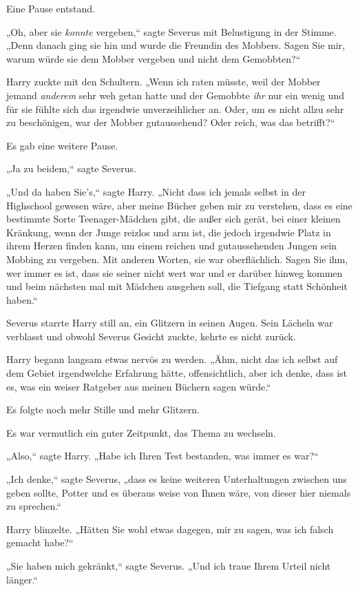 {Eine Pause entstand.

„Oh, aber sie \emph{konnte} vergeben,“ sagte Severus mit Belustigung in der Stimme. „Denn danach ging sie hin und wurde die Freundin des Mobbers. Sagen Sie mir, warum würde sie dem Mobber vergeben und nicht dem Gemobbten?“

Harry zuckte mit den Schultern. „Wenn ich raten müsste, weil der Mobber jemand \emph{anderem} sehr weh getan hatte und der Gemobbte \emph{ihr} nur ein wenig und für sie fühlte sich das irgendwie unverzeihlicher an. Oder, um es nicht allzu sehr zu beschönigen, war der Mobber gutaussehend? Oder reich, was das betrifft?“

Es gab eine weitere Pause.

„Ja zu beidem,“ sagte Severus.

„Und da haben Sie's,“ sagte Harry. „Nicht dass ich jemals selbst in der Highschool gewesen wäre, aber meine Bücher geben mir zu verstehen, dass es eine bestimmte Sorte Teenager-Mädchen gibt, die außer sich gerät, bei einer kleinen Kränkung, wenn der Junge reizlos und arm ist, die jedoch irgendwie Platz in ihrem Herzen finden kann, um einem reichen und gutaussehenden Jungen sein Mobbing zu vergeben. Mit anderen Worten, sie war oberflächlich. Sagen Sie ihm, wer immer es ist, dass sie seiner nicht wert war und er darüber hinweg kommen und beim nächsten mal mit Mädchen ausgehen soll, die Tiefgang statt Schönheit haben.“

Severus starrte Harry still an, ein Glitzern in seinen Augen. Sein Lächeln war verblasst und obwohl Severus Gesicht zuckte, kehrte es nicht zurück.

Harry begann langsam etwas nervös zu werden. „Ähm, nicht das ich selbst auf dem Gebiet irgendwelche Erfahrung hätte, offensichtlich, aber ich denke, dass ist es, was ein weiser Ratgeber aus meinen Büchern sagen würde.“

Es folgte noch mehr Stille und mehr Glitzern.

Es war vermutlich ein guter Zeitpunkt, das Thema zu wechseln.

„Also,“ sagte Harry. „Habe ich Ihren Test bestanden, was immer es war?“

„Ich denke,“ sagte Severus, „dass es keine weiteren Unterhaltungen zwischen uns geben sollte, Potter und es überaus weise von Ihnen wäre, von dieser hier niemals zu sprechen.“

Harry blinzelte. „Hätten Sie wohl etwas dagegen, mir zu sagen, was ich falsch gemacht habe?“

„Sie haben mich gekränkt,“ sagte Severus. „Und ich traue Ihrem Urteil nicht länger.“

}
